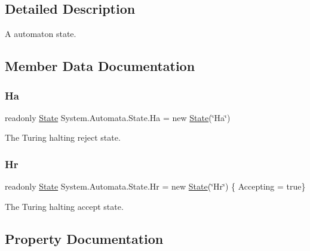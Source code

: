 \subsection{Detailed Description}
A automaton state. 



\subsection{Member Data Documentation}
\mbox{\label{class_system_1_1_automata_1_1_state_ae6639cebabe973cfa8825fedbc4ae741}} 
\subsubsection{\texorpdfstring{Ha}{Ha}}
{\footnotesize\ttfamily readonly \mbox{\hyperlink{class_system_1_1_automata_1_1_state}{State}} System.\+Automata.\+State.\+Ha = new \mbox{\hyperlink{class_system_1_1_automata_1_1_state}{State}}(\char`\"{}Ha\char`\"{})\hspace{0.3cm}{\ttfamily [static]}}



The Turing halting reject state. 

\mbox{\label{class_system_1_1_automata_1_1_state_adb68e0dc49813e402e113d26e7137660}} 
\subsubsection{\texorpdfstring{Hr}{Hr}}
{\footnotesize\ttfamily readonly \mbox{\hyperlink{class_system_1_1_automata_1_1_state}{State}} System.\+Automata.\+State.\+Hr = new \mbox{\hyperlink{class_system_1_1_automata_1_1_state}{State}}(\char`\"{}Hr\char`\"{}) \{ Accepting = true\}\hspace{0.3cm}{\ttfamily [static]}}



The Turing halting accept state. 



\subsection{Property Documentation}
\mbox{\label{class_system_1_1_automata_1_1_state_a2a37b025bd8bf30defe28ae26e339e0e}} 
